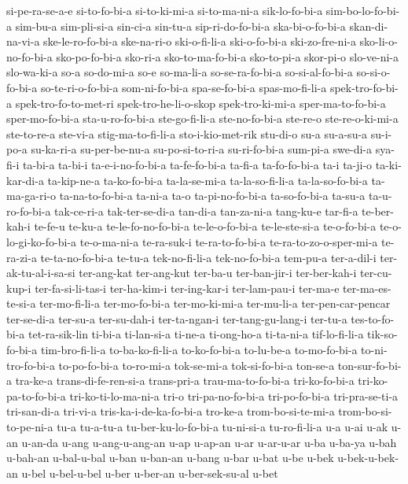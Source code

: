 {si-pe-ra-se-a-e si-to-fo-bi-a si-to-ki-mi-a si-to-ma-ni-a sik-lo-fo-bi-a
sim-bo-lo-fo-bi-a sim-bu-a sim-pli-si-a sin-ci-a sin-tu-a
sip-ri-do-fo-bi-a ska-bi-o-fo-bi-a skan-di-na-vi-a ske-le-ro-fo-bi-a
ske-na-ri-o ski-o-fi-li-a ski-o-fo-bi-a ski-zo-fre-ni-a
sko-li-o-no-fo-bi-a sko-po-fo-bi-a sko-ri-a sko-to-ma-fo-bi-a sko-to-pi-a
skor-pi-o slo-ve-ni-a slo-wa-ki-a so-a so-do-mi-a so-e so-ma-li-a
so-se-ra-fo-bi-a so-si-al-fo-bi-a so-si-o-fo-bi-a so-te-ri-o-fo-bi-a
som-ni-fo-bi-a spa-se-fo-bi-a spas-mo-fi-li-a spek-tro-fo-bi-a
spek-tro-fo-to-met-ri spek-tro-he-li-o-skop spek-tro-ki-mi-a
sper-ma-to-fo-bi-a sper-mo-fo-bi-a sta-u-ro-fo-bi-a ste-go-fi-li-a
ste-no-fo-bi-a ste-re-o ste-re-o-ki-mi-a ste-to-re-a ste-vi-a
stig-ma-to-fi-li-a sto-i-kio-met-rik stu-di-o su-a su-a-su-a su-i-po-a
su-ka-ri-a su-per-be-nu-a su-po-si-to-ri-a su-ri-fo-bi-a sum-pi-a swe-di-a
sya-fi-i ta-bi-a ta-bi-i ta-e-i-no-fo-bi-a ta-fe-fo-bi-a ta-fi-a
ta-fo-fo-bi-a ta-i ta-ji-o ta-ki-kar-di-a ta-kip-ne-a ta-ko-fo-bi-a
ta-la-se-mi-a ta-la-so-fi-li-a ta-la-so-fo-bi-a ta-ma-ga-ri-o
ta-na-to-fo-bi-a ta-ni-a ta-o ta-pi-no-fo-bi-a ta-so-fo-bi-a ta-su-a
ta-u-ro-fo-bi-a tak-ce-ri-a tak-ter-se-di-a tan-di-a tan-za-ni-a tang-ku-e
tar-fi-a te-ber-kah-i te-fe-u te-ku-a te-le-fo-no-fo-bi-a te-le-o-fo-bi-a
te-le-ste-si-a te-o-fo-bi-a te-o-lo-gi-ko-fo-bi-a te-o-ma-ni-a te-ra-suk-i
te-ra-to-fo-bi-a te-ra-to-zo-o-sper-mi-a te-ra-zi-a te-ta-no-fo-bi-a
te-tu-a tek-no-fi-li-a tek-no-fo-bi-a tem-pu-a ter-a-dil-i
ter-ak-tu-al-i-sa-si ter-ang-kat ter-ang-kut ter-ba-u ter-ban-jir-i
ter-ber-kah-i ter-cu-kup-i ter-fa-si-li-tas-i ter-ha-kim-i ter-ing-kar-i
ter-lam-pau-i ter-ma-e ter-ma-es-te-si-a ter-mo-fi-li-a ter-mo-fo-bi-a
ter-mo-ki-mi-a ter-mu-li-a ter-pen-car-pencar ter-se-di-a ter-su-a
ter-su-dah-i ter-ta-ngan-i ter-tang-gu-lang-i ter-tu-a tes-to-fo-bi-a
tet-ra-sik-lin ti-bi-a ti-lan-si-a ti-ne-a ti-ong-ho-a ti-ta-ni-a
tif-lo-fi-li-a tik-so-fo-bi-a tim-bro-fi-li-a to-ba-ko-fi-li-a
to-ko-fo-bi-a to-lu-be-a to-mo-fo-bi-a to-ni-tro-fo-bi-a to-po-fo-bi-a
to-ro-mi-a tok-se-mi-a tok-si-fo-bi-a ton-se-a ton-sur-fo-bi-a tra-ke-a
trans-di-fe-ren-si-a trans-pri-a trau-ma-to-fo-bi-a tri-ko-fo-bi-a
tri-ko-pa-to-fo-bi-a tri-ko-ti-lo-ma-ni-a tri-o tri-pa-no-fo-bi-a
tri-po-fo-bi-a tri-pra-se-ti-a tri-san-di-a tri-vi-a
tris-ka-i-de-ka-fo-bi-a tro-ke-a trom-bo-si-te-mi-a trom-bo-si-to-pe-ni-a
tu-a tu-a-tu-a tu-ber-ku-lo-fo-bi-a tu-ni-si-a tu-ro-fi-li-a u-a u-ai u-ak
u-an u-an-da u-ang u-ang-u-ang-an u-ap u-ap-an u-ar u-ar-u-ar u-ba u-ba-ya
u-bah u-bah-an u-bal-u-bal u-ban u-ban-an u-bang u-bar u-bat u-be u-bek
u-bek-u-bek-an u-bel u-bel-u-bel u-ber u-ber-an u-ber-sek-su-al u-bet
}
